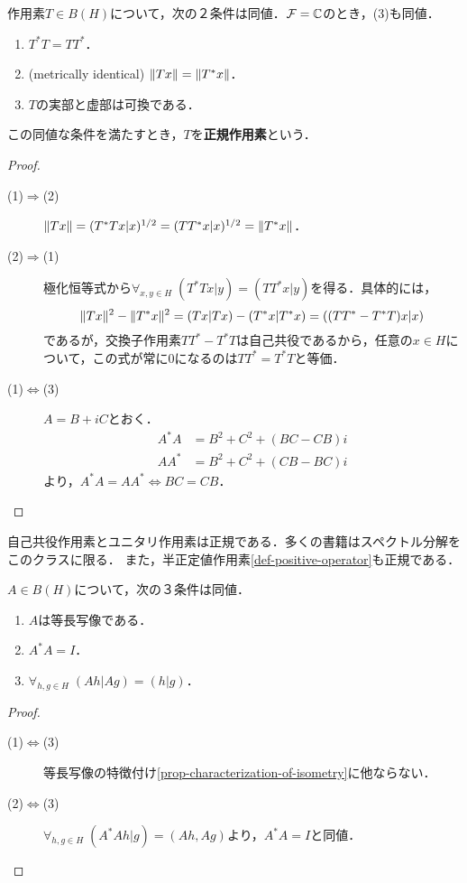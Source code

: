 \documentclass[uplatex,dvipdfmx]{jsreport}
\begin{document}
\begin{definition}[normal]
    作用素$T\in B(H)$について，次の２条件は同値．$\mathcal{F}=\mathbb{C}$のとき，(3)も同値．
    \begin{enumerate}
        \item $T^*T=TT^*$．
        \item (metrically identical) $\|Tx\|=\|T^*x\|$．
        \item $T$の実部と虚部は可換である．
    \end{enumerate}
    この同値な条件を満たすとき，$T$を\textbf{正規作用素}という．
\end{definition}
\begin{proof}\mbox{}
    \begin{description}
        \item[(1)$\Rightarrow$(2)] $\|Tx\|=(T^*Tx|x)^{1/2}=(TT^*x|x)^{1/2}=\|T^*x\|$．
        \item[(2)$\Rightarrow$(1)] 極化恒等式から$\forall_{x,y\in H}\;(T^*Tx|y)=(TT^*x|y)$を得る．具体的には，
        \[\|Tx\|^2-\|T^*x\|^2=(Tx|Tx)-(T^*x|T^*x)=((TT^*-T^*T)x|x)\]
        であるが，交換子作用素$TT^*-T^*T$は自己共役であるから，任意の$x\in H$について，この式が常に$0$になるのは$TT^*=T^*T$と等価．
        \item[(1)$\Leftrightarrow$(3)] $A=B+iC$とおく．
        \begin{align*}
            A^*A&=B^2+C^2+(BC-CB)i\\
            AA^*&=B^2+C^2+(CB-BC)i
        \end{align*}
        より，$A^*A=AA^*\Leftrightarrow BC=CB$．
    \end{description}
\end{proof}

\begin{example}
    自己共役作用素とユニタリ作用素は正規である．多くの書籍はスペクトル分解をこのクラスに限る．
    また，半正定値作用素\ref{def-positive-operator}も正規である．
\end{example}

\begin{proposition}[等長写像の特徴付け]\label{prop-characterization-of-isometry-2}
    $A\in B(H)$について，次の３条件は同値．
    \begin{enumerate}
        \item $A$は等長写像である．
        \item $A^*A=I$．
        \item $\forall_{h,g\in H}\;(Ah|Ag)=(h|g)$．
    \end{enumerate}
\end{proposition}
\begin{proof}\mbox{}
    \begin{description}
        \item[(1)$\Leftrightarrow$(3)] 等長写像の特徴付け\ref{prop-characterization-of-isometry}に他ならない．
        \item[(2)$\Leftrightarrow$(3)] $\forall_{h,g\in H}\;(A^*Ah|g)=(Ah,Ag)$より，$A^*A=I$と同値．
    \end{description}
\end{proof}
\end{document}
